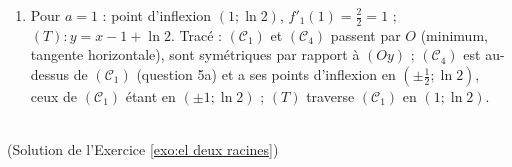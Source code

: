 \begin{corrige}
\begin{sol}
\begin{enumerate}
\begin{enumerate}
      \item $u'(t) = \frac{1}{1+t} - 1 = \frac{-t}{1+t} \leq 0$ sur $[0;+\infty[$ : $u$ est d\'ecroissante et $u(0) = 0$, donc $u(t) \leq 0$,
            c'est-\`a-dire $\ln(1+t) \leq t$ pour $t \geq 0$. Avec $t = ax^2 \geq 0$ : $f_a(x) \leq a x^2$.
      \end{enumerate}
\item Pour $a = 1$ : point d'inflexion $(1 ; \ln 2)$, $f'_1(1) = \frac{2}{2} = 1$ ; $(T) : y = x - 1 + \ln 2$.
      Trac\'e : $(\mathscr{C}_1)$ et $(\mathscr{C}_4)$ passent par $O$ (minimum, tangente horizontale), sont sym\'etriques par rapport \`a $(Oy)$ ;
      $(\mathscr{C}_4)$ est au-dessus de $(\mathscr{C}_1)$ (question 5a) et a ses points d'inflexion en $\left(\pm\frac{1}{2} ; \ln 2\right)$,
      ceux de $(\mathscr{C}_1)$ \'etant en $(\pm 1 ; \ln 2)$ ; $(T)$ traverse $(\mathscr{C}_1)$ en $(1 ; \ln 2)$.
\end{enumerate}
\end{sol}

\begin{sol} ~ \\
(Solution de l'Exercice \ref{exo:el deux racines})


\end{sol}
\end{corrige}
